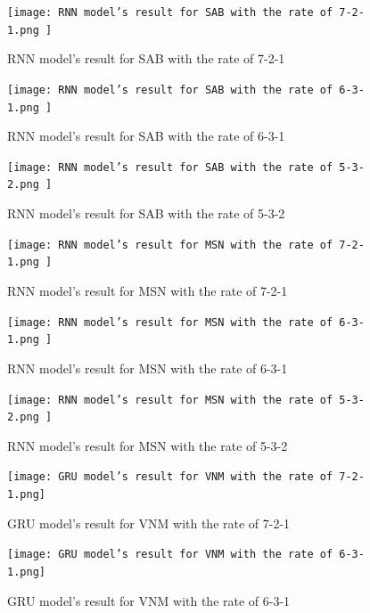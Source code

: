 \documentclass{ieeeojies}
\begin{document}
    \begin{figure}[H]
    \begin{minipage}{0.23\textwidth}
    \centering
    \texttt{[image: RNN model’s result for SAB with the rate of 7-2-1.png ]}
    \caption{RNN model’s result for SAB with the rate of 7-2-1}
    \end{minipage}
    \hfill
    \begin{minipage}{0.23\textwidth}
    \centering
    \texttt{[image: RNN model’s result for SAB with the rate of 6-3-1.png ]}
    \caption{RNN model’s result for SAB with the rate of 6-3-1}
    \end{minipage}
    \end{figure}
    
    \begin{figure}[H]
    \begin{minipage}{0.23\textwidth}
    \centering
    \texttt{[image: RNN model’s result for SAB with the rate of 5-3-2.png ]}
    \caption{RNN model’s result for SAB with the rate of 5-3-2}
    \end{minipage}
     \hfill
     \begin{minipage}{0.23\textwidth}
    \centering
    \texttt{[image: RNN model’s result for MSN with the rate of 7-2-1.png  ]}
    \caption{RNN model’s result for MSN  with the rate of 7-2-1}
    \end{minipage}
     \end{figure}
     
    \begin{figure}[H]
    \begin{minipage}{0.23\textwidth}
    \centering
    \texttt{[image: RNN model’s result for MSN with the rate of 6-3-1.png ]}
    \caption{RNN model’s result for MSN with the rate of 6-3-1}
    \end{minipage}
     \hfill
     \begin{minipage}{0.23\textwidth}
    \centering
    \texttt{[image: RNN model’s result for MSN with the rate of 5-3-2.png  ]}
    \caption{RNN model’s result for MSN  with the rate of 5-3-2}
    \end{minipage}
\end{figure}

   \begin{figure}[H]
    \begin{minipage}{0.23\textwidth}
    \centering
    \texttt{[image: GRU model’s result for VNM with the rate of 7-2-1.png]}
    \caption{GRU model’s result for VNM with the rate of 7-2-1}
    \end{minipage}
    \hfill
    \begin{minipage}{0.23\textwidth}
    \centering
    \texttt{[image: GRU model’s result for VNM with the rate of 6-3-1.png]}
    \caption{GRU model’s result for VNM with the rate of 6-3-1}
    \end{minipage}
    \end{figure}
    
\end{document}
